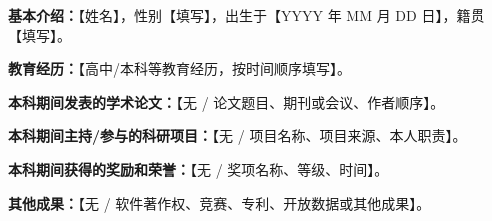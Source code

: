\textbf{基本介绍：}【姓名】，性别【填写】，出生于【YYYY 年 MM 月 DD 日】，籍贯【填写】。

\textbf{教育经历：}【高中/本科等教育经历，按时间顺序填写】。

\textbf{本科期间发表的学术论文：}【无 / 论文题目、期刊或会议、作者顺序】。

\textbf{本科期间主持/参与的科研项目：}【无 / 项目名称、项目来源、本人职责】。

\textbf{本科期间获得的奖励和荣誉：}【无 / 奖项名称、等级、时间】。

\textbf{其他成果：}【无 / 软件著作权、竞赛、专利、开放数据或其他成果】。
